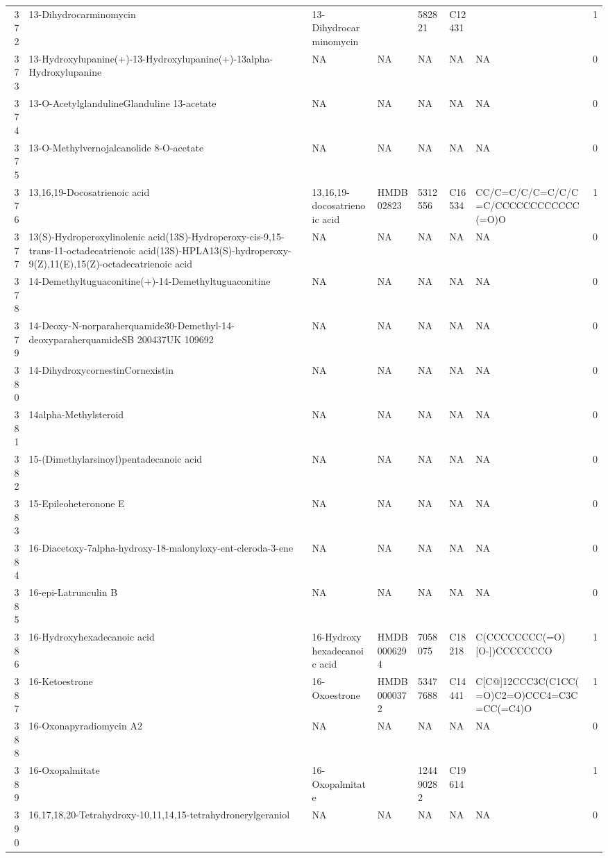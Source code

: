 \documentclass[a4paper]{article}
\begin{document}
\begin{longtable}{rlllllll}
  372 & 13-Dihydrocarminomycin & 13-Dihydrocarminomycin &  & 582821 & C12431 &  & 1 \\ 
  373 & 13-Hydroxylupanine(+)-13-Hydroxylupanine(+)-13alpha-Hydroxylupanine & NA & NA & NA & NA & NA & 0 \\ 
  374 & 13-O-AcetylglandulineGlanduline 13-acetate & NA & NA & NA & NA & NA & 0 \\ 
  375 & 13-O-Methylvernojalcanolide 8-O-acetate & NA & NA & NA & NA & NA & 0 \\ 
  376 & 13,16,19-Docosatrienoic acid & 13,16,19-docosatrienoic acid & HMDB02823 & 5312556 & C16534 & CC/C=C/C/C=C/C/C=C/CCCCCCCCCCCC(=O)O & 1 \\ 
  377 & 13(S)-Hydroperoxylinolenic acid(13S)-Hydroperoxy-cis-9,15-trans-11-octadecatrienoic acid(13S)-HPLA13(S)-hydroperoxy-9(Z),11(E),15(Z)-octadecatrienoic acid & NA & NA & NA & NA & NA & 0 \\ 
  378 & 14-Demethyltuguaconitine(+)-14-Demethyltuguaconitine & NA & NA & NA & NA & NA & 0 \\ 
  379 & 14-Deoxy-N-norparaherquamide30-Demethyl-14-deoxyparaherquamideSB 200437UK 109692 & NA & NA & NA & NA & NA & 0 \\ 
  380 & 14-DihydroxycornestinCornexistin & NA & NA & NA & NA & NA & 0 \\ 
  381 & 14alpha-Methylsteroid & NA & NA & NA & NA & NA & 0 \\ 
  382 & 15-(Dimethylarsinoyl)pentadecanoic acid & NA & NA & NA & NA & NA & 0 \\ 
  383 & 15-Epileoheteronone E & NA & NA & NA & NA & NA & 0 \\ 
  384 & 16-Diacetoxy-7alpha-hydroxy-18-malonyloxy-ent-cleroda-3-ene & NA & NA & NA & NA & NA & 0 \\ 
  385 & 16-epi-Latrunculin B & NA & NA & NA & NA & NA & 0 \\ 
  386 & 16-Hydroxyhexadecanoic acid & 16-Hydroxy hexadecanoic acid & HMDB0006294 & 7058075 & C18218 & C(CCCCCCCC(=O)[O-])CCCCCCCO & 1 \\ 
  387 & 16-Ketoestrone & 16-Oxoestrone & HMDB0000372 & 53477688 & C14441 & C[C@]12CCC3C(C1CC(=O)C2=O)CCC4=C3C=CC(=C4)O & 1 \\ 
  388 & 16-Oxonapyradiomycin A2 & NA & NA & NA & NA & NA & 0 \\ 
  389 & 16-Oxopalmitate & 16-Oxopalmitate &  & 124490282 & C19614 &  & 1 \\ 
  390 & 16,17,18,20-Tetrahydroxy-10,11,14,15-tetrahydronerylgeraniol & NA & NA & NA & NA & NA & 0 \\ 

\end{longtable}
\end{document}
